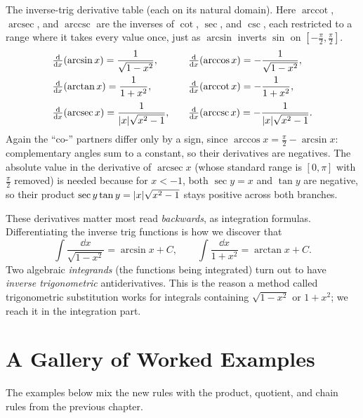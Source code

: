 \begin{focusbox}
The inverse-trig derivative table (each on its natural domain). Here
$\operatorname{arccot}$, $\operatorname{arcsec}$, and $\operatorname{arccsc}$ are
the inverses of $\cot$, $\sec$, and $\csc$, each restricted to a range where it
takes every value once, just as $\arcsin$ inverts $\sin$ on
$[-\tfrac\pi2,\tfrac\pi2]$.
\[
\begin{array}{ll}
\frac{\mathrm{d}}{\mathrm{d} x}\!\left(\arcsin x\right) = \dfrac{1}{\sqrt{1-x^2}}, &\quad
\frac{\mathrm{d}}{\mathrm{d} x}\!\left(\arccos x\right) = -\dfrac{1}{\sqrt{1-x^2}}, \\[10pt]
\frac{\mathrm{d}}{\mathrm{d} x}\!\left(\arctan x\right) = \dfrac{1}{1+x^2}, &\quad
\frac{\mathrm{d}}{\mathrm{d} x}\!\left(\operatorname{arccot} x\right) = -\dfrac{1}{1+x^2}, \\[10pt]
\frac{\mathrm{d}}{\mathrm{d} x}\!\left(\operatorname{arcsec} x\right) = \dfrac{1}{\lvert x\rvert\sqrt{x^2-1}}, &\quad
\frac{\mathrm{d}}{\mathrm{d} x}\!\left(\operatorname{arccsc} x\right) = -\dfrac{1}{\lvert x\rvert\sqrt{x^2-1}}.
\end{array}
\]
Again the ``co-'' partners differ only by a sign, since
$\arccos x = \tfrac\pi2 - \arcsin x$: complementary angles sum to a constant,
so their derivatives are negatives. The absolute value in the derivative of
$\operatorname{arcsec} x$ (whose standard range is $[0,\pi]$ with $\tfrac\pi2$
removed) is needed because for $x<-1$, both $\sec y = x$ and
$\tan y$ are negative, so their product $\sec y\tan y = \lvert x\rvert\sqrt{x^2-1}$ stays
positive across both branches.
\end{focusbox}

\begin{connectionbox}
These derivatives matter most read \emph{backwards}, as integration
formulas. Differentiating the inverse trig functions is how we discover that
\[
   \int \frac{\dd x}{\sqrt{1-x^2}} = \arcsin x + C,
   \qquad
   \int \frac{\dd x}{1+x^2} = \arctan x + C.
\]
Two algebraic \emph{integrands} (the functions being integrated) turn out to
have \emph{inverse trigonometric} antiderivatives. This is the reason a method
called trigonometric substitution works for integrals containing
$\sqrt{1-x^2}$ or $1+x^2$; we reach it in the integration part.
\end{connectionbox}

\section{A Gallery of Worked Examples}
\label{ch12:gallery}

The examples below mix the new rules with the product, quotient,
and chain rules from the previous chapter.

